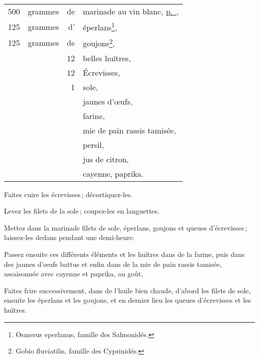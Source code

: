 \footnotesize
\begin{longtable}{rrrp{16em}}
    500 & grammes & de & marinade au vin blanc, \hyperlink{p0385}{p. \pageref{pg0385}},                   \\
    125 & grammes & d' & éperlans\footnote{Osmerus eperlanus, famille des Salmonidés.},                   \\
    125 & grammes & de & goujons\footnote{Gobio fluviatilis, famille des Cyprinidés.},                    \\
        &         & 12 & belles huîtres,                                                                  \\
        &         & 12 & Écrevisses,                                                                      \\
        &         &  1 & sole,                                                                            \\
        &         &    & jaunes d'œufs,                                                                   \\
        &         &    & farine,                                                                          \\
        &         &    & mie de pain rassis tamisée,                                                      \\
        &         &    & persil,                                                                          \\
        &         &    & jus de citron,                                                                   \\
        &         &    & cayenne, paprika.                                                                \\
\end{longtable}
\normalsize

Faites cuire les écrevisses ; décortiquez-les.

Levez les filets de la sole ; coupez-les en languettes.

Mettez dans la marinade filets de sole, éperlans, goujons et queues
d'écrevisses ; laissez-les dedans pendant une demi-heure.

Passez ensuite ces différents éléments et les huîtres dans de la farine, puis
dans des jaunes d'œufs battus et enfin dans de la mie de pain rassis tamisée,
assaisonnée avec cayenne et paprika, au goût.

Faites frire successivement, dans de l'huile bien chaude, d’abord les filets de
sole, ensuite les éperlans et les goujons, et en dernier lieu les queues
d’écrevisses et les huîtres.

